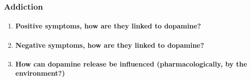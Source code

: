 \documentclass[12pt,article,oneside,a4paper]{memoir}
\begin{document}
\subsubsection{Addiction}
\begin{enumerate}
\item \paragraph{Positive symptoms, how are they linked to dopamine?}
\item \paragraph{Negative symptoms, how are they linked to dopamine?}
\item \paragraph{How can dopamine release be influenced  (pharmacologically, by the environment?)}
\end{enumerate}
\end{document}
